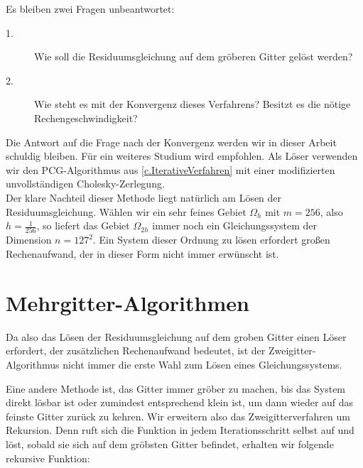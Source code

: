 Es bleiben zwei Fragen unbeantwortet:
\begin{description}
\item[1.] Wie soll die Residuumsgleichung auf dem gröberen Gitter gelöst werden?
\item[2.] Wie steht es mit der Konvergenz dieses Verfahrens? Besitzt es die nötige Rechengeschwindigkeit?
\end{description}

Die Antwort auf die Frage nach der Konvergenz werden wir in dieser Arbeit schuldig bleiben. Für ein weiteres Studium wird \cite[S. 435-437]{SAAD03} empfohlen.
Als Löser verwenden wir den PCG-Algorithmus aus \autoref{c.IterativeVerfahren} mit einer modifizierten unvollständigen Cholesky-Zerlegung.\\

Der klare Nachteil dieser Methode liegt natürlich am Lösen der Residuumsgleichung. Wählen wir ein sehr feines Gebiet $\Omega_{h}$ mit $m = 256$, also $h = \frac {1} {256}$, so liefert das Gebiet $\Omega_{2h}$ immer noch ein Gleichungssystem der Dimension $n = 127^{2}$. Ein System dieser Ordnung zu lösen erfordert großen Rechenaufwand, der in dieser Form nicht immer erwünscht ist. \\

\section{Mehrgitter-Algorithmen}\label{s.Mehrgitteralgorithmus}

Da also das Lösen der Residuumsgleichung auf dem groben Gitter einen Löser erfordert, der zusätzlichen Rechenaufwand bedeutet, ist der Zweigitter-Algorithmus nicht immer die erste Wahl zum Lösen eines Gleichungssystems.

Eine andere Methode ist, das Gitter immer gröber zu machen, bis das System direkt lösbar ist oder zumindest entsprechend klein ist, um dann wieder auf das feinste Gitter zurück zu kehren. Wir erweitern also das Zweigitterverfahren um Rekursion. Denn ruft sich die Funktion in jedem Iterationsschritt selbst auf und löst, sobald sie sich auf dem gröbsten Gitter befindet, erhalten wir folgende rekursive Funktion:

